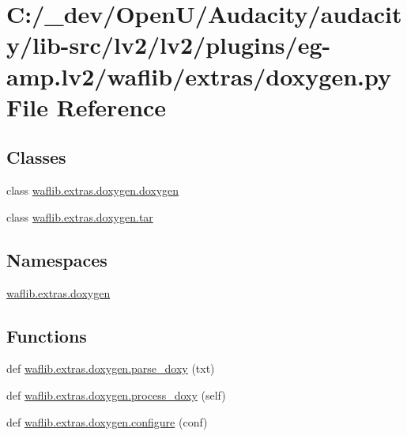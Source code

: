 \hypertarget{lv2_2plugins_2eg-amp_8lv2_2waflib_2extras_2doxygen_8py}{}\section{C\+:/\+\_\+dev/\+Open\+U/\+Audacity/audacity/lib-\/src/lv2/lv2/plugins/eg-\/amp.lv2/waflib/extras/doxygen.py File Reference}
\label{lv2_2plugins_2eg-amp_8lv2_2waflib_2extras_2doxygen_8py}
\subsection*{Classes}
\begin{DoxyCompactItemize}
\item 
class \hyperlink{classwaflib_1_1extras_1_1doxygen_1_1doxygen}{waflib.\+extras.\+doxygen.\+doxygen}
\item 
class \hyperlink{classwaflib_1_1extras_1_1doxygen_1_1tar}{waflib.\+extras.\+doxygen.\+tar}
\end{DoxyCompactItemize}
\subsection*{Namespaces}
\begin{DoxyCompactItemize}
\item 
 \hyperlink{namespacewaflib_1_1extras_1_1doxygen}{waflib.\+extras.\+doxygen}
\end{DoxyCompactItemize}
\subsection*{Functions}
\begin{DoxyCompactItemize}
\item 
def \hyperlink{namespacewaflib_1_1extras_1_1doxygen_ad00d728a0949db6dd441165547e07e7a}{waflib.\+extras.\+doxygen.\+parse\+\_\+doxy} (txt)
\item 
def \hyperlink{namespacewaflib_1_1extras_1_1doxygen_a88b85c6ce6a068c606c3e035e84d8760}{waflib.\+extras.\+doxygen.\+process\+\_\+doxy} (self)
\item 
def \hyperlink{namespacewaflib_1_1extras_1_1doxygen_a172fdeb5aa82f9d3d452b22a5f4abe70}{waflib.\+extras.\+doxygen.\+configure} (conf)
\end{DoxyCompactItemize}

